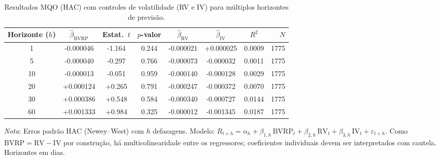 \begin{table}[H]
\centering
\caption{Resultados MQO (HAC) com controles de volatilidade (RV e IV) para múltiplos horizontes de previsão.}
\label{tab:ols_controles_multihoriz}
\footnotesize
\begin{adjustbox}{max width=\textwidth}
\begin{tabular}{cccccccr}
\toprule
Horizonte ($h$) & $\hat{\beta}_{\text{BVRP}}$ & Estat.\ $t$ & $p$-valor & $\hat{\beta}_{\text{RV}}$ & $\hat{\beta}_{\text{IV}}$ & $R^2$ & $N$ \\
\midrule
  1 & -0.000046 & -1.164 & 0.244 & -0.000021 & +0.000025 & 0.0009 & 1775 \\
  5 & -0.000040 & -0.297 & 0.766 & -0.000073 & -0.000032 & 0.0011 & 1775 \\
 10 & -0.000013 & -0.051 & 0.959 & -0.000140 & -0.000128 & 0.0029 & 1775 \\
 20 & +0.000124 & +0.265 & 0.791 & -0.000247 & -0.000372 & 0.0070 & 1775 \\
 30 & +0.000386 & +0.548 & 0.584 & -0.000340 & -0.000727 & 0.0144 & 1775 \\
 60 & +0.001333 & +0.984 & 0.325 & -0.000012 & -0.001345 & 0.0187 & 1775 \\
\bottomrule
\end{tabular}
\end{adjustbox}
\smallskip
\begin{minipage}{0.92\linewidth}
\footnotesize
\textit{Nota}: Erros padrão HAC (Newey--West) com $h$ defasagens. Modelo: $R_{t+h} = \alpha_h +
\beta_{1,h}\,\text{BVRP}_t + \beta_{2,h}\,\text{RV}_t + \beta_{3,h}\,\text{IV}_t + \varepsilon_{t+h}$.
Como $\text{BVRP} = \text{RV} - \text{IV}$ por construção, há multicolinearidade entre os regressores;
coeficientes individuais devem ser interpretados com cautela. Horizontes em dias.
\end{minipage}
\end{table}

